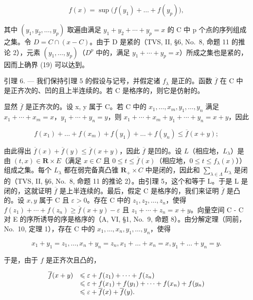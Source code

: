 \[
f (x) = \sup \bigl (f (y _ {1}) + \dots + f (y _ {p}) \bigr),\tag{19}
\]

其中 \((y_{1}, y_{2}, \ldots, y_{p})\) 取遍由满足 \(y_{1} + y_{2} + \cdots + y_{p} = x\) 的 C 中 p 个点的序列组成之集。令 \(D = C \cap (x - C)\)。由于 D 是紧的（TVS, II, §6, No.~8, 命题 11 的推论 2），元素 \((y_{1}, \ldots, y_{p})\)（\(D^{p}\) 中的，满足 \(y_{1} + \cdots + y_{p} = x\)）所成之集也是紧的，因而上确界 (19) 可以达到。

引理 6. --- 我们保持引理 5 的假设与记号，并假定诸 \(f_{\lambda}\) 是正的。函数 \(\overline{f}\) 在 C 中是正齐次的、凹的且上半连续的。若 C 是格序的，则它是仿射的。

显然 \(\overline{f}\) 是正齐次的。设 x, y 属于 C。若 C 中的 \(x_{1}, \ldots, x_{m}, y_{1}, \ldots, y_{n}\) 满足 \(x_{1} + \cdots + x_{m} = x\)，\(y_{1} + \cdots + y_{n} = y\)，则 \(x_{1} + \cdots + x_{m} + y_{1} + \cdots + y_{n} = x + y\)，因此

\[
f (x _ {1}) + \dots + f (x _ {m}) + f (y _ {1}) + \dots + f (y _ {n}) \leqslant \overline {{f}} (x + y);
\]

由此得出 \(\overline{f}(x) + \overline{f}(y) \leqslant \overline{f}(x + y)\)，因此 \(\overline{f}\) 是凹的。设 \(L\)（相应地，\(L_{\lambda}\)）是由 \((t, x) \in \mathbf{R} \times E\)（满足 \(x \in C\) 且 \(0 \leqslant t \leqslant \overline{f}(x)\)（相应地，\(0 \leqslant t \leqslant f_{\lambda}(x)\)））组成之集。每个 \(L_{\lambda}\) 都在弱完备真凸锥 \(\mathbf{R}_{+} \times C\) 中是闭的，因此和 \(\sum_{\lambda \in \Lambda} L_{\lambda}\) 是闭的（TVS, II, §6, No.~8, 命题 11 的推论 2）。由引理 5，这个和等于 L。于是 L 是闭的，这就证明 \(\overline{f}\) 是上半连续的。最后，假定 C 是格序的，我们来证明 \(\overline{f}\) 是凸的。设 \(x, y\) 属于 C 且 \(\varepsilon > 0\)。存在 C 中的 \(z_1, z_2, \ldots, z_n\)，使得 \(f(z_1) + \cdots + f(z_n) \geqslant \overline{f}(x + y) - \varepsilon\) 且 \(z_1 + \cdots + z_n = x + y\)。向量空间 C - C 对 E 的序所诱导的序是格序的（A, VI, §1, No.~9, 命题 8）。由分解定理（同前，No.~10, 定理 1），存在 C 中的 \(x_1, \ldots, x_n, y_1, \ldots, y_n\)，使得

\[
x _ {1} + y _ {1} = z _ {1}, \dots , x _ {n} + y _ {n} = z _ {n}, x _ {1} + \dots + x _ {n} = x, y _ {1} + \dots + y _ {n} = y.
\]

于是，由于 \(f\) 是正齐次且凸的，

\[
\begin{array}{r l} \overline {{f}} (x + y) & \leqslant \varepsilon + f (z _ {1}) + \dots + f (z _ {n}) \\ & \leqslant \varepsilon + f (x _ {1}) + f (y _ {1}) + \dots + f (x _ {n}) + f (y _ {n}) \\ & \leqslant \varepsilon + \overline {{f}} (x) + \overline {{f}} (y). \end{array}
\]

